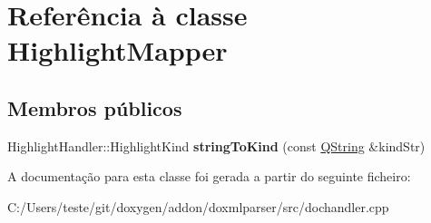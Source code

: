 \hypertarget{class_highlight_mapper}{\section{Referência à classe Highlight\-Mapper}
\label{class_highlight_mapper}
}
\subsection*{Membros públicos}
\begin{DoxyCompactItemize}
\item 
\hypertarget{class_highlight_mapper_a731762274c9c3376504468126b9df473}{Highlight\-Handler\-::\-Highlight\-Kind {\bfseries string\-To\-Kind} (const \hyperlink{class_q_string}{Q\-String} \&kind\-Str)}\label{class_highlight_mapper_a731762274c9c3376504468126b9df473}

\end{DoxyCompactItemize}


A documentação para esta classe foi gerada a partir do seguinte ficheiro\-:\begin{DoxyCompactItemize}
\item 
C\-:/\-Users/teste/git/doxygen/addon/doxmlparser/src/dochandler.\-cpp\end{DoxyCompactItemize}

